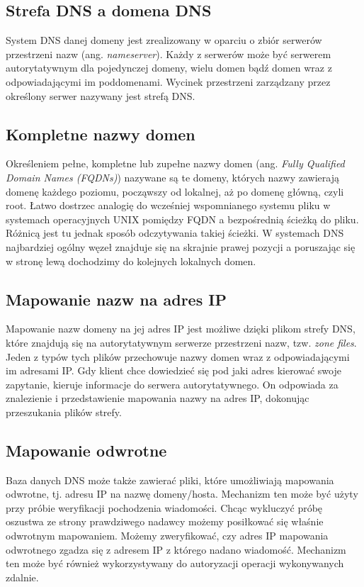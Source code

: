 \subsection{Strefa DNS a domena DNS}
System DNS danej domeny jest zrealizowany w oparciu o zbiór serwerów przestrzeni nazw (ang. \textit{nameserver}). Każdy z serwerów
może być serwerem autorytatywnym dla pojedynczej domeny, wielu domen bądź domen wraz z odpowiadającymi im poddomenami. Wycinek
przestrzeni zarządzany przez określony serwer nazywany jest strefą DNS.


\subsection{Kompletne nazwy domen}
\label{sec:FQDN}
\noindent Określeniem pełne, kompletne lub zupełne nazwy domen (ang. \textit{Fully Qualified Domain Names (FQDNs)}) nazywane są te domeny,
których nazwy zawierają domenę każdego poziomu, począwszy od lokalnej, aż po domenę główną, czyli root. Łatwo dostrzec analogię
do wcześniej wspomnianego systemu pliku w systemach operacyjnych UNIX pomiędzy FQDN a bezpośrednią ścieżką do pliku. Różnicą jest
tu jednak sposób odczytywania takiej ścieżki. W systemach DNS najbardziej ogólny węzeł znajduje się na skrajnie prawej pozycji a
poruszając się w stronę lewą dochodzimy do kolejnych lokalnych domen.

\subsection{Mapowanie nazw na adres IP}
\label{mapping}
\noindent Mapowanie nazw domeny na jej adres IP jest możliwe dzięki plikom strefy DNS, które znajdują się na autorytatywnym serwerze
przestrzeni nazw, tzw. \textit{zone files}. Jeden z typów tych plików przechowuje nazwy domen wraz z odpowiadającymi im adresami
IP. Gdy klient chce dowiedzieć się pod jaki adres kierować swoje zapytanie, kieruje informacje do serwera autorytatywnego. On
odpowiada za znalezienie i przedstawienie mapowania nazwy na adres IP, dokonując przeszukania plików strefy.

\subsection{Mapowanie odwrotne}
\label{revmapping}
\noindent Baza danych DNS może także zawierać pliki, które umożliwiają mapowania odwrotne, tj. adresu IP na nazwę domeny/hosta. Mechanizm ten
może być użyty przy próbie weryfikacji pochodzenia wiadomości. Chcąc wykluczyć próbę oszustwa ze strony prawdziwego nadawcy możemy
posiłkować się właśnie odwrotnym mapowaniem. Możemy zweryfikować, czy adres IP mapowania odwrotnego zgadza się z adresem IP z którego
nadano wiadomość. Mechanizm ten może być również wykorzystywany do autoryzacji operacji wykonywanych zdalnie.

